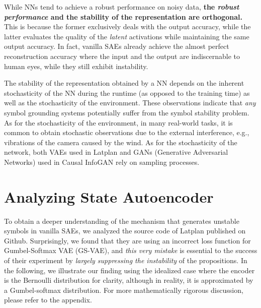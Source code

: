 While NNs tend to achieve a robust performance on noisy data,
\textbf{the \emph{robust performance} and the stability of the representation are orthogonal.}
This is because the former exclusively deals with the output accuracy,
while the latter evaluates the quality of the \emph{latent} activations while maintaining the same output accuracy.
In fact, vanilla SAEs already achieve the almost perfect reconstruction accuracy
where the input and the output are indiscernable to human eyes,
while they still exhibit instability.


The stability of the representation obtained by a NN depends
on
the inherent stochasticity of the NN during the runtime (as opposed to the training time) as well as
the stochasticity of the environment.
% 
These observations indicate that \emph{any} symbol grounding systems potentially suffer from 
the symbol stability problem.
% 
As for the stochasticity of the environment,
in many real-world tasks, it is common to obtain stochastic observations
due to the external interference, e.g., vibrations of the camera caused by the wind.
% 
As for the stochasticity of the network,
both
VAEs \cite{kingma2013auto,jang2016categorical,higgins2016beta} used in Latplan
and
GANs (Generative Adversarial Networks) \cite{goodfellow2014generative} used in Causal InfoGAN \cite{kurutach2018learning}
rely on sampling processes.

\section{Analyzing State Autoencoder}
\label{analysis}

To obtain a deeper understanding of the mechanism that generates
unstable symbols in vanilla SAEs, we
analyzed the source code of Latplan published on Github.
% 
Surprisingly, we found that they are using an incorrect loss function for Gumbel-Softmax VAE (GS-VAE),
and \emph{this very mistake} is essential to the success of their experiment
by \emph{largely suppressing the instability} of the propositions.
In the following, we illustrate our finding using the idealized case where the encoder is the Bernoulli distribution for clarity, although in reality, it is approximated by a Gumbel-softmax distribution.
For more mathematically rigorous discussion, please refer to the appendix.

